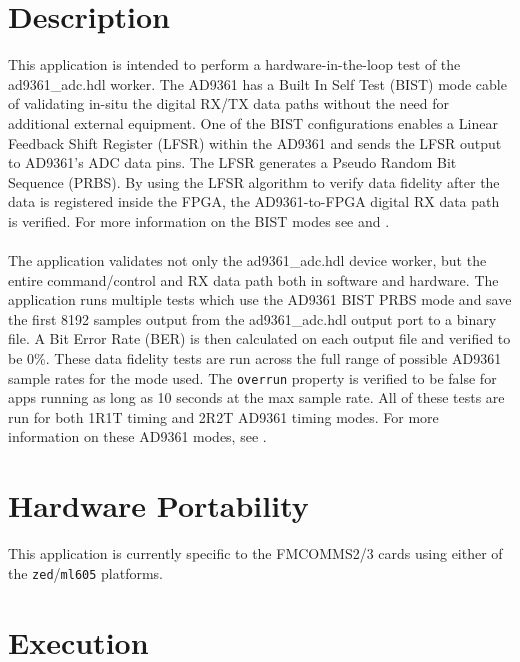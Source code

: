 \section{Description}
This application is intended to perform a hardware-in-the-loop test of the ad9361\_adc.hdl worker.
The AD9361 has a Built In Self Test (BIST) mode cable of validating in-situ the digital RX/TX data paths without the need for additional external equipment. One of the BIST configurations enables a Linear Feedback Shift Register (LFSR) within the AD9361 and sends the LFSR output to AD9361's ADC data pins. The LFSR generates a Pseudo Random Bit Sequence (PRBS). By using the LFSR algorithm to verify data fidelity after the data is registered inside the FPGA, the AD9361-to-FPGA digital RX data path is verified. For more information on the BIST modes see \cite{adi_bist_doc} and \cite{adi_ug570}. \\ \\
The application validates not only the ad9361\_adc.hdl device worker, but the entire command/control and RX data path both in software and hardware.
The application runs multiple tests which use the AD9361 BIST PRBS mode and save the first 8192 samples output from the ad9361\_adc.hdl output port to a binary file. A Bit Error Rate (BER) is then calculated on each output file and verified to be 0\%. These data fidelity tests are run across the full range of possible AD9361 sample rates for the mode used. The \verb+overrun+ property is verified to be false for apps running as long as 10 seconds at the max sample rate. All of these tests are run for both 1R1T timing and 2R2T AD9361 timing modes. For more information on these AD9361 modes, see \cite{adi_ug570}.

\section{Hardware Portability}
This application is currently specific to the FMCOMMS2/3 cards using either of the \verb+zed+/\verb+ml605+ platforms.

\section{Execution}
